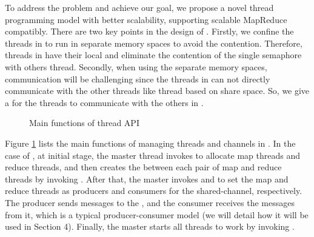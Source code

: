 To address the problem and achieve our goal, we propose a novel thread programming model \myth with better scalability, supporting scalable MapReduce compatibly.
There are two key points in the design of \myth.
Firstly, we confine the threads in \myth to run in separate memory spaces to avoid the contention.
Therefore, threads in \myth have their local  and eliminate the contention of the single semaphore with others thread.
Secondly, when using the separate memory spaces, communication will be challenging since the threads in \myth can not directly communicate with the other threads like thread based on share space.
So, we give a \chan for the threads to communicate with the others in \myth. 




\label{sec:pm:thread}
\begin{figure}[htpb]

\caption{Main functions of \myth thread API}
\label{fig:api:thread}
\end{figure}

Figure \ref{fig:api:thread} lists the main functions of managing threads and channels in \myth.
In the case of \myds, at initial stage, the master thread invokes  to allocate map threads and reduce threads, and then creates the \chan  between each pair of map and reduce threads by invoking .
After that, the master invokes  and  to set the map and reduce threads as producers and consumers for the shared-channel, respectively.
The producer sends messages to the \chan, and the consumer receives the messages from it,
which is a typical producer-consumer model (we will detail how it will be used in Section 4). 
Finally, the master starts all threads to work by invoking .

